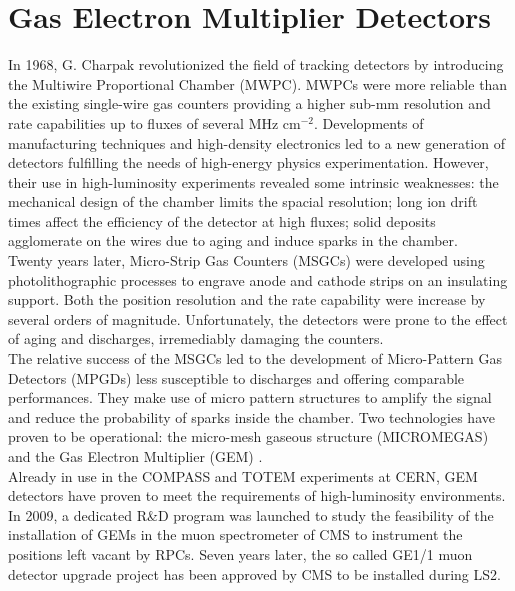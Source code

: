 \chapter{Gas Electron Multiplier Detectors}
\label{chap:II-1-gem}

  In 1968, G. Charpak revolutionized the field of tracking detectors by introducing the Multiwire Proportional Chamber (MWPC). MWPCs were more reliable than the existing single-wire gas counters providing a higher sub-mm resolution and rate capabilities up to fluxes of several MHz cm$^{-2}$. Developments of manufacturing techniques and high-density electronics led to a new generation of detectors fulfilling the needs of high-energy physics experimentation. However, their use in high-luminosity experiments revealed some intrinsic weaknesses: the mechanical design of the chamber limits the spacial resolution; long ion drift times affect the efficiency of the detector at high fluxes; solid deposits agglomerate on the wires due to aging and induce sparks in the chamber. \\

  Twenty years later, Micro-Strip Gas Counters (MSGCs) were developed using photolithographic processes to engrave anode and cathode strips on an insulating support. Both the position resolution and the rate capability were increase by several orders of magnitude. Unfortunately, the detectors were prone to the effect of aging and discharges, irremediably damaging the counters. \\

  The relative success of the MSGCs led to the development of Micro-Pattern Gas Detectors (MPGDs) less susceptible to discharges and offering comparable performances. They make use of micro pattern structures to amplify the signal and reduce the probability of sparks inside the chamber. Two technologies have proven to be operational: the micro-mesh gaseous structure (MICROMEGAS) and the Gas Electron Multiplier (GEM) \cite{SAULI1997531}. \\

  Already in use in the COMPASS and TOTEM experiments at CERN, GEM detectors have proven to meet the requirements of high-luminosity environments. In 2009, a dedicated R\&D program was launched to study the feasibility of the installation of GEMs in the muon spectrometer of CMS to instrument the positions left vacant by RPCs. Seven years later, the so called GE1/1 muon detector upgrade project has been approved by CMS to be installed during LS2.

